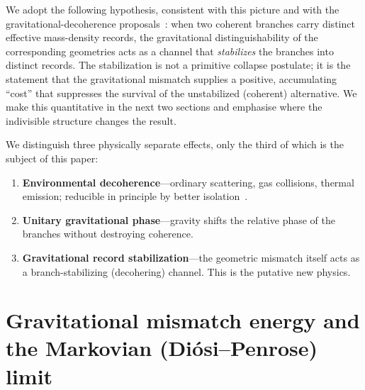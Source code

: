 \documentclass[aps,prd,onecolumn,amsmath,amssymb,nofootinbib,superscriptaddress]{revtex4-2}
\begin{document}
We adopt the following hypothesis, consistent with this picture and with the gravitational-decoherence
proposals~\cite{R1,R2,R3,R20}: when two coherent branches carry distinct effective mass-density
records, the gravitational distinguishability of the corresponding geometries acts as a channel that
\emph{stabilizes} the branches into distinct records. The stabilization is not a primitive collapse
postulate; it is the statement that the gravitational mismatch supplies a positive, accumulating
``cost'' that suppresses the survival of the unstabilized (coherent) alternative. We make this
quantitative in the next two sections and emphasise where the indivisible structure changes the
result.

We distinguish three physically separate effects, only the third of which is the subject of this paper:
\begin{enumerate}
\item \textbf{Environmental decoherence}---ordinary scattering, gas collisions, thermal emission;
reducible in principle by better isolation~\cite{R14,R16}.
\item \textbf{Unitary gravitational phase}---gravity shifts the relative phase of the branches
without destroying coherence.
\item \textbf{Gravitational record stabilization}---the geometric mismatch itself acts as a
branch-stabilizing (decohering) channel. This is the putative new physics.
\end{enumerate}

\section{Gravitational mismatch energy and the Markovian (Di\'osi--Penrose) limit}\label{sec:dp}
\end{document}
